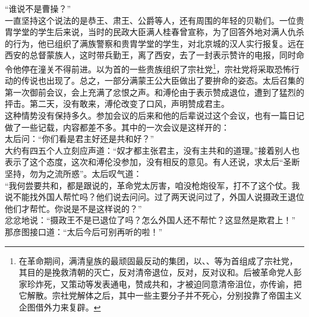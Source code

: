 “谁说不是曹操？”\\

一直坚持这个说法的是恭王、肃王、公爵等人，还有周围的年轻的贝勒们。一位贵胄学堂的学生后来说，当时的民政大臣满人桂春曾宣称，为了回答外地对满人仇杀的行为，他已组织了满族警察和贵胄学堂的学生，对北京城的汉人实行报复。远在西安的总督蒙族人，这时带兵勤王，离了西安，去了一封表示赞许的电报，同时命令他停在潼关不得前进。以为首的一些贵族组织了宗社党\footnote{在革命期间，满清皇族的最顽固最反动的集团，以、、等为首组成了宗社党，其目的是挽救清朝的灭亡，反对清帝退位，反对，反对议和。后被革命党人彭家珍炸死，又策动等发表通电，赞成共和，才被迫同意清帝沮位，亦传谕，把它解散。宗社党解体之后，其中一些主要分子并不死心，分别投靠了帝国主义企图借外力来复辟。}，宗社党将采取恐怖行动的传说也出现了。总之，一部分满蒙王公大臣做出了要拚命的姿态。太后召集的第一次御前会议，会上充满了忿恨之声。和溥伦由于表示赞成退位，遭到了猛烈的抨击。第二天，没有敢来，溥伦改变了口风，声明赞成君主。\\

这种情势没有保持多久。参加会议的后来和他的后辈说过这个会议，也有一篇日记做了一些记载，内容都差不多。其中的一次会议是这样开的：\\

太后问：“你们看是君主好还是共和好？”\\

大约有四五个人立刻应声道：“奴才都主张君主，没有主共和的道理。”接着别人也表示了这个态度，这次和溥伦没参加，没有相反的意见。有人还说，求太后“圣断坚持，勿为之流所惑”。太后叹气道：\\

“我何尝要共和，都是跟说的，革命党太厉害，咱没枪炮役军，打不了这个仗。我说不能找外国人帮忙吗？他们说去问问。过了两天说问过了，外国人说摄政王退位他们才帮忙。你说是不是这样说的？”\\

忿忿地说：“摄政王不是已退位了吗？怎么外国人还不帮忙？这显然是欺君上！”\\

那彦图接口道：“太后今后可别再听的啦！”\\

